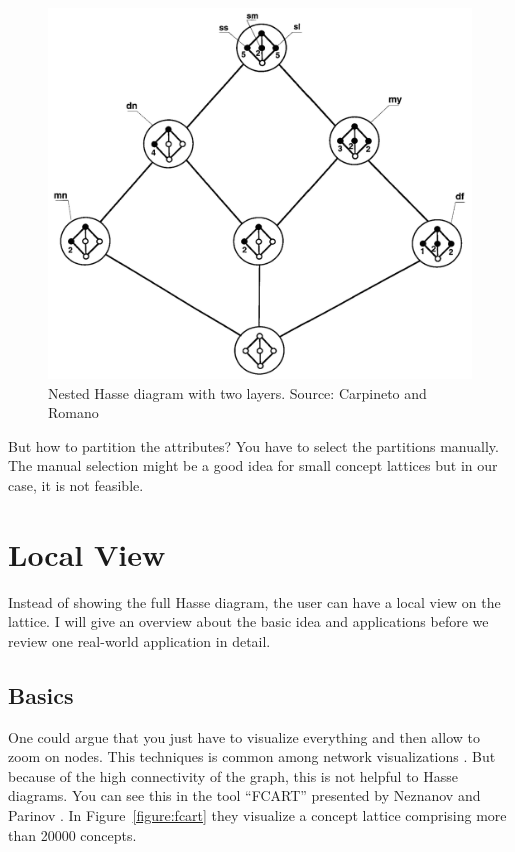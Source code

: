 \documentclass[11pt]{report}
\begin{document}
\begin{figure}[!ht]
	\centering
	\includegraphics[width=\linewidth]{./images/nested}
\caption{Nested Hasse diagram with two layers. Source: Carpineto and Romano \cite{carpineto2004concept}}
\label{figure:nested}
\end{figure}
	
But how to partition the attributes? You have to select the partitions manually. The manual selection might be a good idea for small concept lattices but in our case, it is not feasible.

\section{Local View}
\label{Local View}

Instead of showing the full Hasse diagram, the user can have a local view on the lattice. I will give an overview about the basic idea and applications before we review one real-world application in detail.

\subsection{Basics}

One could argue that you just have to visualize everything and then allow to zoom on nodes. This techniques is common among network visualizations \cite{Herman2000}. But because of the high connectivity of the graph, this is not helpful to Hasse diagrams. You can see this in the tool ``FCART'' presented by Neznanov and Parinov \cite{Neznanov2014}. In Figure~\ref{figure:fcart} they visualize a concept lattice comprising more than 20000 concepts. \\
\end{document}
